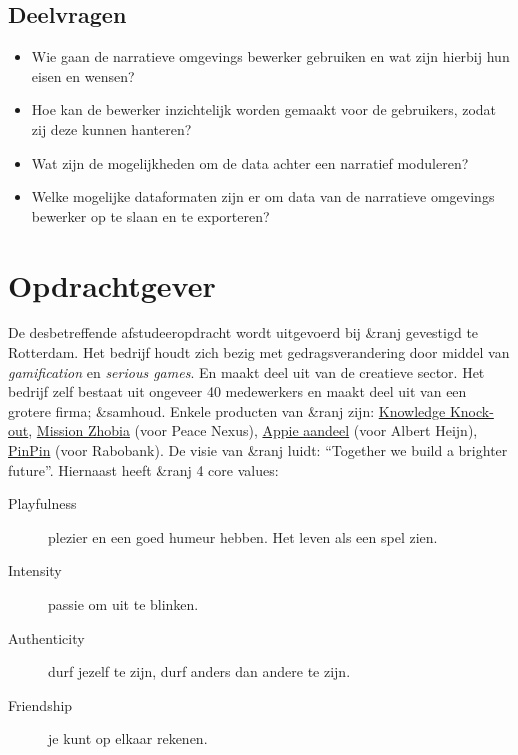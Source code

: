 \documentclass{report}
\newcommand{\organisation}{\&ranj }
\begin{document}
\subsection{Deelvragen}
\begin{itemize}
\item Wie gaan de narratieve omgevings bewerker gebruiken en wat zijn hierbij hun eisen en wensen?
\item Hoe kan de bewerker inzichtelijk worden gemaakt voor de gebruikers, zodat zij deze kunnen hanteren?
\item Wat zijn de mogelijkheden om de data achter een narratief moduleren?
\item Welke mogelijke dataformaten zijn er om data van de narratieve omgevings bewerker op te slaan en te exporteren?
\end{itemize}

\section{Opdrachtgever}
De desbetreffende afstudeeropdracht wordt uitgevoerd bij \organisation gevestigd te Rotterdam. Het bedrijf houdt zich bezig met gedragsverandering door middel van \emph{gamification} en \emph{serious games}. En maakt deel uit van de creatieve sector.
Het bedrijf zelf bestaat uit ongeveer 40 medewerkers en maakt deel uit van een grotere firma; \&samhoud. Enkele producten van \organisation zijn: \href{https://ranj.com/products#knowledge-knock-out}{Knowledge Knock-out}, \href{https://ranj.com/projects/corporate/development#mission-zhobia}{Mission Zhobia} (voor Peace Nexus), \href{https://ranj.com/projects/corporate/development#appie-aandeel}{Appie aandeel} (voor Albert Heijn), \href{https://ranj.com/projects/education#pinpin}{PinPin} (voor Rabobank).
De visie van \organisation luidt: ``Together we build a brighter future''.
Hiernaast heeft \organisation 4 core values:
\begin{description}
\item[Playfulness] plezier en een goed humeur hebben. Het leven als een spel zien.
\item[Intensity] passie om uit te blinken.
\item[Authenticity] durf jezelf te zijn, durf anders dan andere te zijn.
\item[Friendship] je kunt op elkaar rekenen.
\end{description}
\end{document}
